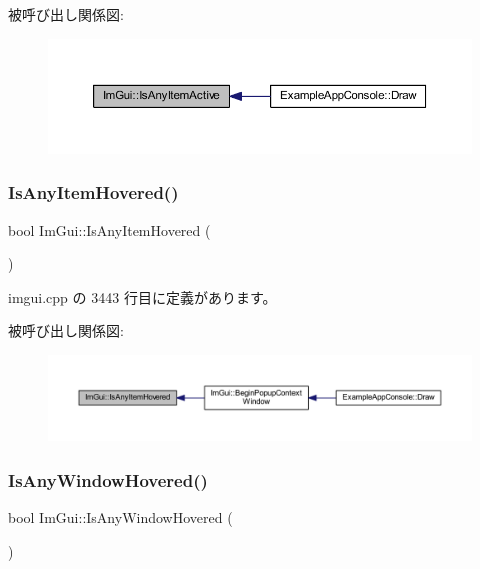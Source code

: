 被呼び出し関係図\+:\nopagebreak
\begin{figure}[H]
\begin{center}
\leavevmode
\includegraphics[width=350pt]{namespace_im_gui_acdc18199d50d26919312db5f9707b8dc_icgraph}
\end{center}
\end{figure}
\mbox{\label{namespace_im_gui_a0512146617bb55e24ebcfbe3ce6553d5}} 
\subsubsection{\texorpdfstring{Is\+Any\+Item\+Hovered()}{IsAnyItemHovered()}}
{\footnotesize\ttfamily bool Im\+Gui\+::\+Is\+Any\+Item\+Hovered (\begin{DoxyParamCaption}{ }\end{DoxyParamCaption})}



 imgui.\+cpp の 3443 行目に定義があります。

被呼び出し関係図\+:\nopagebreak
\begin{figure}[H]
\begin{center}
\leavevmode
\includegraphics[width=350pt]{namespace_im_gui_a0512146617bb55e24ebcfbe3ce6553d5_icgraph}
\end{center}
\end{figure}
\mbox{\label{namespace_im_gui_a62379e94283e247288c9a6c15a2b797e}} 
\subsubsection{\texorpdfstring{Is\+Any\+Window\+Hovered()}{IsAnyWindowHovered()}}
{\footnotesize\ttfamily bool Im\+Gui\+::\+Is\+Any\+Window\+Hovered (\begin{DoxyParamCaption}{ }\end{DoxyParamCaption})}



